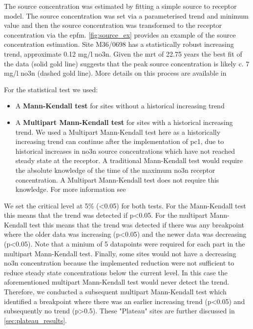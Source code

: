 The source concentration was estimated by fitting a simple source to receptor model. The source concentration was set via a parameterised trend and minimum value and then the source concentration was transformed to the receptor concentration via the \gls{epfm}. \autoref{fig:source_ex} provides an example of the source concentration estimation. Site M36/0698 has a statistically robust increasing trend, approximate 0.12 mg/l \gls{no3n}. Given the \gls{mrt} of 22.75 years the best fit of the data (solid gold line) suggests that the peak source concentration is likely c. 7 mg/l \gls{no3n} (dashed gold line). More details on this process are available in %


For the statistical test we used:
\begin{itemize}
    \item A \textbf{Mann-Kendall test} for sites without a historical increasing trend
    \item A \textbf{Multipart Mann-Kendall test} for sites with a historical increasing trend. We used a Multipart Mann-Kendall test here as a historically increasing trend can continue after the implementation of \gls{pc1}, due to historical increases in \gls{no3n} source concentrations which have not reached steady state at the receptor. A traditional Mann-Kendall test would require the absolute knowledge of the time of the maximum \gls{no3n} receptor concentration. A Multipart Mann-Kendall test does not require this knowledge. For more information see %
\end{itemize}

We set the critical level at 5\% (<0.05) for both tests. For the Mann-Kendall test this means that the trend was detected if p<0.05. For the multipart Mann-Kendall test this means that the trend was detected if there was any breakpoint where the older data was increasing (p<0.05) and the newer data was decreasing (p<0.05). Note that a minium of 5 datapoints were required for each part in the multipart Mann-Kendall test. Finally, some sites would not have a decreasing \gls{no3n} concentration because the implemented reduction were not sufficient to reduce steady state concentrations below the current level. In this case the aforementioned multipart Mann-Kendall test would never detect the trend. Therefore, we conducted a subsequent multipart Mann-Kendall test which identified a breakpoint where there was an earlier increasing trend (p<0.05) and subsequently no trend (p>0.5). These "Plateau" sites are further discussed in \autoref{sec:plateau_results}.

